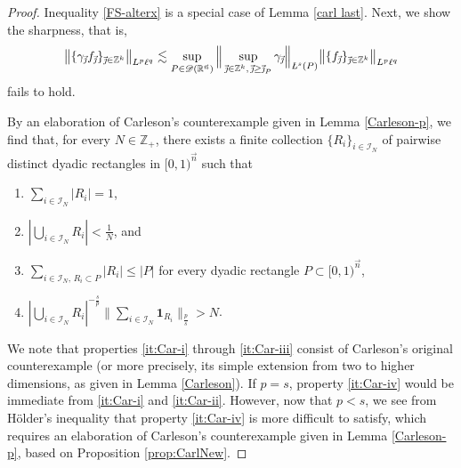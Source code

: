 \documentclass[11pt, reqno]{amsart}
\theoremstyle{definition}
\theoremstyle{remark}
\numberwithin{equation}{section}
\newcommand{\D}{\mathscr D}
\newcommand{\vj}{\vec{\textit{\j}}}
\newcommand{\one}{\mathbf{1}}
\newcommand{\aveL}{\textit{\L}}
\newcommand{\abs}[1]{|#1|}
\newcommand{\Norm}[2]{\|#1\|_{#2}}
\newcommand{\bNorm}[2]{\big\|#1\big\|_{#2}}
\begin{document}
\begin{proof}
Inequality \eqref{FS-alterx} is a special case of Lemma \ref{carl last}.
Next, we show the sharpness, that is,
\begin{equation}\label{FS-alter-2x}
\bNorm{\{\gamma_{\vj}f_{\vj}\}_{\vj\in\mathbb Z^k}}{L^p\ell^q}
\lesssim \sup_{P\in \D(\mathbb R^{\vec n})}
\Big\|\sup_{\vj\in\mathbb Z^k,\,\vj\geq \vj_P}
\gamma_{\vj}\Big\|_{\aveL^s(P)}
\bNorm{\{ f_{\vj}\}_{\vj\in\mathbb Z^k}}{L^p\ell^q}
\end{equation}
fails to hold.

By an elaboration of Carleson's counterexample \cite{Car} given in Lemma \ref{Carleson-p}, we find that, for every $N\in\mathbb Z_+$,
there exists a finite collection $\{R_i\}_{i\in \mathscr I_N}$ of
pairwise distinct dyadic rectangles in $[0,1)^{\vec n}$ such that
\begin{enumerate}[\rm(i)]
\item\label{it:Car-i} $\sum_{i\in \mathscr I_N} |R_i|=1$,

\item\label{it:Car-ii} $\abs{\bigcup_{i\in \mathscr I_N} R_i}<\frac1N$, and

\item\label{it:Car-iii} $\sum_{i\in \mathscr I_N,\,R_i\subset P} |R_i| \leq |P|$ for every dyadic rectangle $P\subset[0,1)^{\vec n}$,

\item\label{it:Car-iv} $\abs{\bigcup_{i\in \mathscr I_N} R_i}^{-\frac sp}\Norm{\sum_{i\in\mathscr I_N}\one_{R_i}}{\frac ps}>N$.
\end{enumerate}

We note that properties \eqref{it:Car-i} through \eqref{it:Car-iii} consist of Carleson's original counterexample (or more precisely, its simple extension from two to higher dimensions, as given in Lemma \ref{Carleson}). If $p=s$, property \eqref{it:Car-iv} would be immediate from \eqref{it:Car-i} and \eqref{it:Car-ii}. However, now that $p<s$, we see from H\"older's inequality that property \eqref{it:Car-iv} is more difficult to satisfy, which requires an elaboration of Carleson's counterexample given in Lemma \ref{Carleson-p}, based on Proposition \ref{prop:CarlNew}.


\end{proof}
\end{document}
